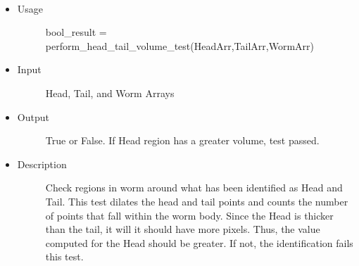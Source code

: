 \documentclass[letterpaper,10pt,oneside]{sphinxmanual}
\begin{document}
\begin{fulllineitems}
\label{index:libcelegans.perform_head_tail_volume_test}~\begin{itemize}
\item {} \begin{description}
\item[{Usage}] \leavevmode
bool\_result = perform\_head\_tail\_volume\_test(HeadArr,TailArr,WormArr)

\end{description}

\item {} \begin{description}
\item[{Input}] \leavevmode
Head, Tail, and Worm Arrays

\end{description}

\item {} \begin{description}
\item[{Output}] \leavevmode
True or False. If Head region has a greater volume, test passed.

\end{description}

\item {} \begin{description}
\item[{Description }] \leavevmode
Check regions in worm around what has been identified as Head and Tail.
This test dilates the head and tail points and counts the number of 
points that fall within the worm body. Since the Head is thicker 
than the tail, it will it should have more pixels. 
Thus, the value computed for the Head should be greater.  If not, 
the identification fails this test.

\end{description}

\end{itemize}

\end{fulllineitems}

\end{document}
